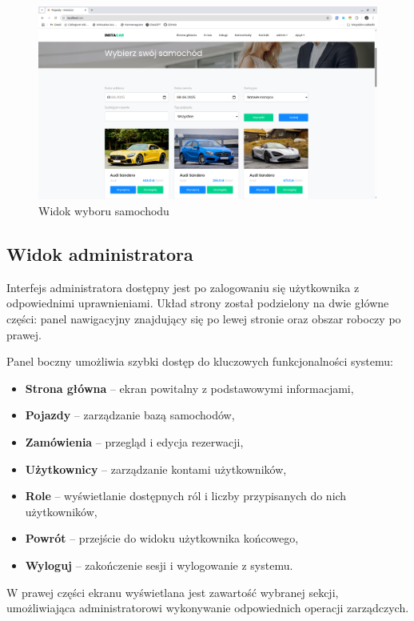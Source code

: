 \documentclass[12pt]{article}
\begin{document}
	\begin{figure}[H]
		\centering
		\includegraphics[width=1\linewidth]{cars}
		\caption{Widok wyboru samochodu}
		\label{fig:cars}
	\end{figure}
	
	\subsection{Widok administratora}
	
	Interfejs administratora dostępny jest po zalogowaniu się użytkownika z odpowiednimi uprawnieniami. Układ strony został podzielony na dwie główne części: panel nawigacyjny znajdujący się po lewej stronie oraz obszar roboczy po prawej.
	
	Panel boczny umożliwia szybki dostęp do kluczowych funkcjonalności systemu:
	
	\begin{itemize}
		\item \textbf{Strona główna} – ekran powitalny z podstawowymi informacjami,
		\item \textbf{Pojazdy} – zarządzanie bazą samochodów,
		\item \textbf{Zamówienia} – przegląd i edycja rezerwacji,
		\item \textbf{Użytkownicy} – zarządzanie kontami użytkowników,
		\item \textbf{Role} – wyświetlanie dostępnych ról i liczby przypisanych do nich użytkowników,
		\item \textbf{Powrót} – przejście do widoku użytkownika końcowego,
		\item \textbf{Wyloguj} – zakończenie sesji i wylogowanie z systemu.
	\end{itemize}
	
	W prawej części ekranu wyświetlana jest zawartość wybranej sekcji, umożliwiająca administratorowi wykonywanie odpowiednich operacji zarządczych.
	
\end{document}
